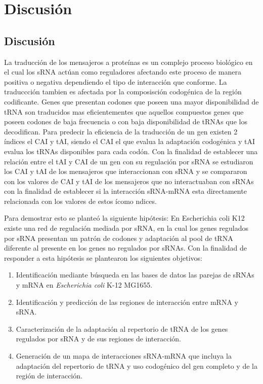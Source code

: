 \chapter{Discusi\'{o}n}

\section{Discusi\'on}

La traducci\'on de los mensajeros a prote\'inas es un complejo proceso biol\'ogico en el cual los sRNA act\'uan como reguladores afectando este proceso de manera positiva o negativa dependiendo el tipo de interacci\'on que conforme. La traduccci\'on tambien es afectada por la composisci\'on codog\'enica de la regi\'on codificante. Genes que presentan codones que poseen una mayor disponibilidad de tRNA son traducidos mas eficientementes que aquellos compuestos genes que poseen codones de baja frecuencia o con baja disponibilidad de tRNAs que los decodifican. Para predecir la eficiencia de la traducci\'on de un gen existen 2 \'indices el CAI y tAI, siendo el CAI el que evalua la adaptaci\'on codog\'enica y tAI evalua los tRNAs disponibles para cada cod\'on. Con la finalidad de establecer una relaci\'on entre el tAI y CAI de un gen con su regulaci\'on por sRNA se estudiaron los CAI y tAI de los mensajeros que interaccionan con sRNA y se compararon con los valores de CAI y tAI de los mensajeros que no interactuaban con sRNAs con la finalidad de establecer si la interacci\'on sRNA-mRNA esta directamente relacionada con los valores de estos \'icomo ndices.

Para demostrar esto se plante\'o la siguiente hip\'otesis: En Escherichia coli K12 existe una red de regulaci\'on mediada por sRNA, en la cual los genes regulados por sRNA presentan un patr\'on de codones y adaptaci\'on al pool de tRNA diferente al presente en los genes no regulados por sRNAs. Con la finalidad de responder a esta hip\'otesis se plantearon los siguientes objetivos:

\begin{enumerate}
	\item Identificaci\'on mediante b\'usqueda en las bases de datos las parejas de sRNAs y mRNA en \textit{Escherichia coli} K-12 MG1655.
	
	\item Identificaci\'on y predicci\'on de las regiones de interacci\'on entre mRNA y sRNA.
	
	\item Caracterizaci\'on de la adaptaci\'on al repertorio de tRNA de los genes regulados por sRNA y de sus regiones de interacci\'on.
	
	\item Generaci\'on de un mapa de interacciones sRNA-mRNA que incluya la adaptaci\'on del repertorio de tRNA y uso codog\'enico del gen completo y de la regi\'on de interacci\'on.
\end{enumerate}

